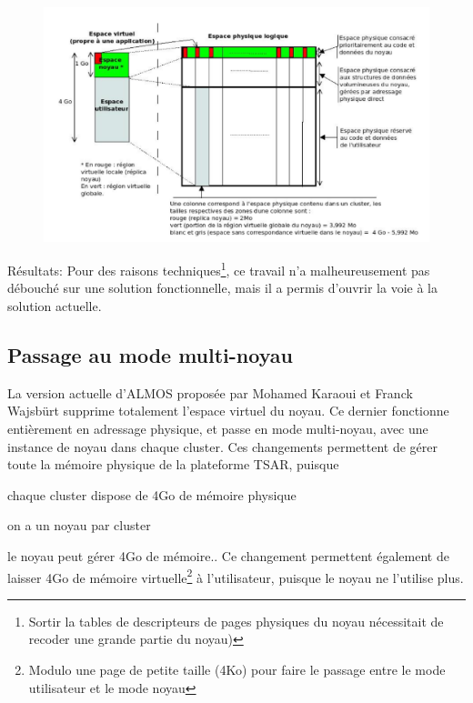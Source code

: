       \begin{figure}[!h]
        \centering \includegraphics[scale=0.17]{include/img/almos-guerret}
        \caption{}
        \label{almos-guerret}
      \end{figure}
      
      \begin{paragraph}{Résultats:}
        Pour des raisons techniques\footnote{Sortir la tables de descripteurs de
          pages physiques du noyau nécessitait de recoder une grande partie du
          noyau)}, ce travail n'a malheureusement pas débouché sur une solution
        fonctionnelle, mais il a permis d'ouvrir la voie à la solution actuelle.
      \end{paragraph}

      
  \subsection{Passage au mode multi-noyau}
      
    La version actuelle d'ALMOS proposée par Mohamed Karaoui et Franck Wajsbürt
    supprime totalement l'espace virtuel du noyau. Ce dernier fonctionne
    entièrement en adressage physique, et passe en mode multi-noyau, avec une
    instance de noyau dans chaque cluster. Ces changements permettent de gérer
    toute la mémoire physique de la plateforme TSAR, puisque \benumline \item
    chaque cluster dispose de 4Go de mémoire physique \item on a un noyau par
    cluster \item le noyau peut gérer 4Go de mémoire.\eenumline. Ce changement
    permettent également de laisser 4Go de mémoire virtuelle\footnote{Modulo une
      page de petite taille (4Ko) pour faire le passage entre le mode
      utilisateur et le mode noyau} à l'utilisateur, puisque le noyau ne
    l'utilise plus.


